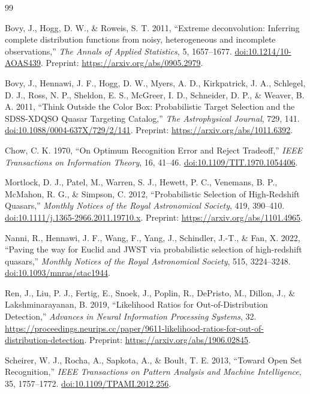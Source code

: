 \documentclass[11pt]{article}
\begin{document}
\begin{thebibliography}{99}

Bovy, J., Hogg, D. W., \& Roweis, S. T. 2011,
``Extreme deconvolution: Inferring complete distribution functions from
noisy, heterogeneous and incomplete observations,''
\emph{The Annals of Applied Statistics}, 5, 1657--1677.
\href{https://doi.org/10.1214/10-AOAS439}{doi:10.1214/10-AOAS439}.
Preprint: \url{https://arxiv.org/abs/0905.2979}.

Bovy, J., Hennawi, J. F., Hogg, D. W., Myers, A. D.,
Kirkpatrick, J. A., Schlegel, D. J., Ross, N. P., Sheldon, E. S.,
McGreer, I. D., Schneider, D. P., \& Weaver, B. A. 2011,
``Think Outside the Color Box: Probabilistic Target Selection and the
SDSS-XDQSO Quasar Targeting Catalog,''
\emph{The Astrophysical Journal}, 729, 141.
\href{https://doi.org/10.1088/0004-637X/729/2/141}
{doi:10.1088/0004-637X/729/2/141}.
Preprint: \url{https://arxiv.org/abs/1011.6392}.

Chow, C. K. 1970,
``On Optimum Recognition Error and Reject Tradeoff,''
\emph{IEEE Transactions on Information Theory}, 16, 41--46.
\href{https://doi.org/10.1109/TIT.1970.1054406}
{doi:10.1109/TIT.1970.1054406}.

Mortlock, D. J., Patel, M., Warren, S. J., Hewett, P. C.,
Venemans, B. P., McMahon, R. G., \& Simpson, C. 2012,
``Probabilistic Selection of High-Redshift Quasars,''
\emph{Monthly Notices of the Royal Astronomical Society}, 419, 390--410.
\href{https://doi.org/10.1111/j.1365-2966.2011.19710.x}
{doi:10.1111/j.1365-2966.2011.19710.x}.
Preprint: \url{https://arxiv.org/abs/1101.4965}.

Nanni, R., Hennawi, J. F., Wang, F., Yang, J., Schindler, J.-T.,
\& Fan, X. 2022,
``Paving the way for Euclid and JWST via probabilistic selection of
high-redshift quasars,''
\emph{Monthly Notices of the Royal Astronomical Society},
515, 3224--3248.
\href{https://doi.org/10.1093/mnras/stac1944}
{doi:10.1093/mnras/stac1944}.

Ren, J., Liu, P. J., Fertig, E., Snoek, J., Poplin, R.,
DePristo, M., Dillon, J., \& Lakshminarayanan, B. 2019,
``Likelihood Ratios for Out-of-Distribution Detection,''
\emph{Advances in Neural Information Processing Systems}, 32.
\url{https://proceedings.neurips.cc/paper/9611-likelihood-ratios-for-out-of-distribution-detection}.
Preprint: \url{https://arxiv.org/abs/1906.02845}.

Scheirer, W. J., Rocha, A., Sapkota, A., \& Boult, T. E. 2013,
``Toward Open Set Recognition,''
\emph{IEEE Transactions on Pattern Analysis and Machine Intelligence},
35, 1757--1772.
\href{https://doi.org/10.1109/TPAMI.2012.256}
{doi:10.1109/TPAMI.2012.256}.

\end{thebibliography}
\end{document}

